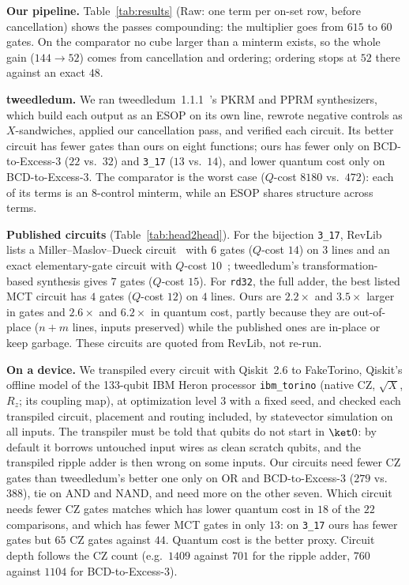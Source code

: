 \documentclass[conference]{IEEEtran}
\theoremstyle{plain}
\begin{document}
\textbf{Our pipeline.} Table~\ref{tab:results} (Raw: one term per
on-set row, before cancellation) shows the passes compounding: the
multiplier goes from $615$ to $60$ gates. On the comparator no cube
larger than a minterm exists, so the whole gain ($144\to52$) comes from
cancellation and ordering; ordering stops at $52$ there against an exact
$48$.

\textbf{tweedledum.} We ran tweedledum~1.1.1~\cite{schmitt2022}'s PKRM
and PPRM synthesizers, which build each output as an ESOP on its own
line, rewrote negative controls as $X$-sandwiches, applied our
cancellation pass, and verified each circuit. Its better circuit has
fewer gates than ours on eight functions; ours has fewer only on
BCD-to-Excess-3 ($22$ vs.\ $32$) and \texttt{3\_17} ($13$ vs.\ $14$), and
lower quantum cost only on BCD-to-Excess-3. The comparator is the worst
case ($Q$-cost $8180$ vs.\ $472$): each of its terms is an 8-control
minterm, while an ESOP shares structure across terms.

\textbf{Published circuits} (Table~\ref{tab:head2head}). For the bijection \texttt{3\_17}, RevLib
lists a Miller--Maslov--Dueck circuit~\cite{miller2003} with $6$ gates
($Q$-cost $14$) on $3$ lines and an exact elementary-gate circuit with
$Q$-cost $10$~\cite{grosse2008}; tweedledum's transformation-based
synthesis gives $7$ gates ($Q$-cost $15$). For \texttt{rd32}, the full
adder, the best listed MCT circuit has $4$ gates ($Q$-cost $12$) on $4$
lines. Ours are $2.2\times$ and $3.5\times$ larger in gates and
$2.6\times$ and $6.2\times$ in quantum cost, partly because they are
out-of-place ($n+m$ lines, inputs preserved) while the published ones
are in-place or keep garbage. These circuits are quoted from RevLib,
not re-run.

\textbf{On a device.} We transpiled every circuit with Qiskit~2.6 to
FakeTorino, Qiskit's offline model of the 133-qubit IBM Heron processor
\texttt{ibm\_torino} (native CZ, $\sqrt{X}$, $R_z$; its coupling map),
at optimization level 3 with a fixed seed, and checked each transpiled
circuit, placement and routing included, by statevector simulation on
all inputs. The transpiler must be told that qubits do not start in
$\ket0$: by default it borrows untouched input wires as clean scratch
qubits, and the transpiled ripple adder is then wrong on some inputs.
Our circuits need fewer CZ gates than tweedledum's better one only on OR
and BCD-to-Excess-3 ($279$ vs.\ $388$), tie on AND and NAND, and need
more on the other seven. Which circuit needs fewer CZ gates matches
which has lower quantum cost in $18$ of the $22$ comparisons, and which
has fewer MCT gates in only $13$: on \texttt{3\_17} ours has fewer gates
but $65$ CZ gates against $44$. Quantum cost is the better proxy.
Circuit depth follows the CZ count (e.g.\ $1409$ against $701$ for the
ripple adder, $760$ against $1104$ for BCD-to-Excess-3).
\end{document}
